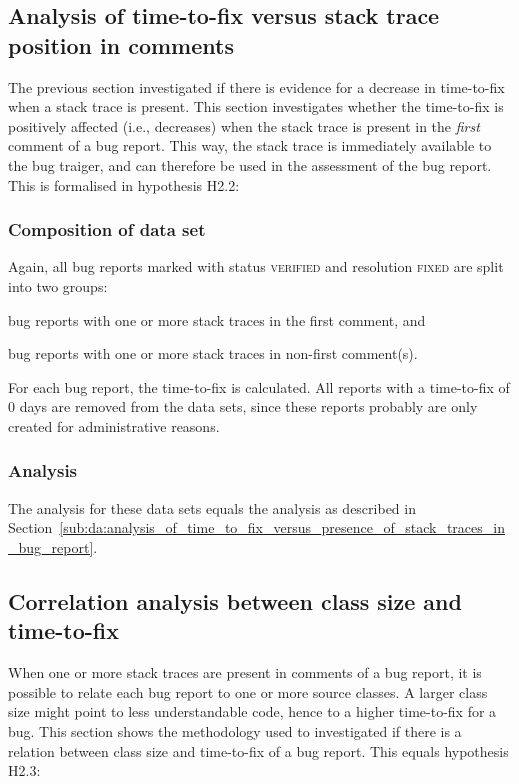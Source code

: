 \subsection{Analysis of time-to-fix versus stack trace position in comments} %
\label{sub:da:analysis_of_time_to_fix_versus_stack_trace_position_in_comments}
The previous section investigated if there is evidence for a decrease in time-to-fix when a stack trace is present. This section investigates whether the time-to-fix is positively affected (i.e., decreases) when the stack trace is present in the \emph{first} comment of a bug report. This way, the stack trace is immediately available to the bug traiger, and can therefore be used in the assessment of the bug report. This is formalised in hypothesis H2.2:

\vspace{\baselineskip}
\hypbb{}

\subsubsection{Composition of data set}
Again, all bug reports marked with status \textsc{verified} and resolution \textsc{fixed} are split into two groups: 

\begin{enumerate*}
	\item bug reports with one or more stack traces in the first comment, and
	\item bug reports with one or more stack traces in non-first comment(s).
\end{enumerate*}

For each bug report, the time-to-fix is calculated. All reports with a time-to-fix of $0$ days are removed from the data sets, since these reports probably are only created for administrative reasons.

\subsubsection{Analysis}
The analysis for these data sets equals the analysis as described in Section~\ref{sub:da:analysis_of_time_to_fix_versus_presence_of_stack_traces_in_bug_report}.


\subsection{Correlation analysis between class size and time-to-fix} %
\label{sub:da:correlation_analysis_between_class_size_and_time_to_fix}
When one or more stack traces are present in comments of a bug report, it is possible to relate each bug report to one or more source classes. A larger class size might point to less understandable code, hence to a higher time-to-fix for a bug. This section shows the methodology used to investigated if there is a relation between class size and time-to-fix of a bug report. This equals hypothesis H2.3:

